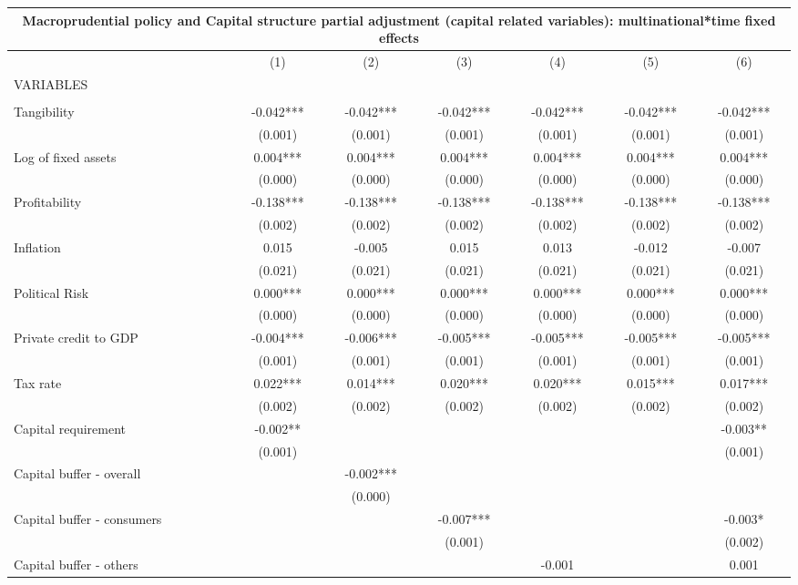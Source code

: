 \begin{tabular}{lcccccc}
\multicolumn{7}{c}{Macroprudential policy and Capital structure partial adjustment (capital related variables): multinational*time fixed effects} \\ \hline
 & (1) & (2) & (3) & (4) & (5) & (6) \\
VARIABLES &  &  &  &  &  &  \\ \hline
 &  &  &  &  &  &  \\
Tangibility & -0.042*** & -0.042*** & -0.042*** & -0.042*** & -0.042*** & -0.042*** \\
 & (0.001) & (0.001) & (0.001) & (0.001) & (0.001) & (0.001) \\
Log of fixed assets & 0.004*** & 0.004*** & 0.004*** & 0.004*** & 0.004*** & 0.004*** \\
 & (0.000) & (0.000) & (0.000) & (0.000) & (0.000) & (0.000) \\
Profitability & -0.138*** & -0.138*** & -0.138*** & -0.138*** & -0.138*** & -0.138*** \\
 & (0.002) & (0.002) & (0.002) & (0.002) & (0.002) & (0.002) \\
Inflation & 0.015 & -0.005 & 0.015 & 0.013 & -0.012 & -0.007 \\
 & (0.021) & (0.021) & (0.021) & (0.021) & (0.021) & (0.021) \\
Political Risk & 0.000*** & 0.000*** & 0.000*** & 0.000*** & 0.000*** & 0.000*** \\
 & (0.000) & (0.000) & (0.000) & (0.000) & (0.000) & (0.000) \\
Private credit to GDP & -0.004*** & -0.006*** & -0.005*** & -0.005*** & -0.005*** & -0.005*** \\
 & (0.001) & (0.001) & (0.001) & (0.001) & (0.001) & (0.001) \\
Tax rate & 0.022*** & 0.014*** & 0.020*** & 0.020*** & 0.015*** & 0.017*** \\
 & (0.002) & (0.002) & (0.002) & (0.002) & (0.002) & (0.002) \\
Capital requirement & -0.002** &  &  &  &  & -0.003** \\
 & (0.001) &  &  &  &  & (0.001) \\
Capital buffer - overall &  & -0.002*** &  &  &  &  \\
 &  & (0.000) &  &  &  &  \\
Capital buffer - consumers &  &  & -0.007*** &  &  & -0.003* \\
 &  &  & (0.001) &  &  & (0.002) \\
Capital buffer - others &  &  &  & -0.001 &  & 0.001 \\

\end{tabular}
